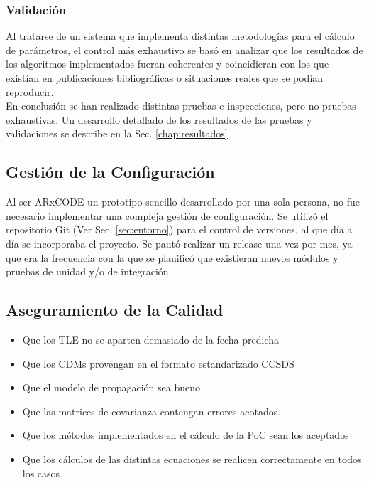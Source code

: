 \subsubsection*{Validaci\'on}

Al tratarse de un sistema que implementa distintas metodolog\'ias para el c\'alculo de par\'ametros, el control m\'as exhaustivo se bas\'o en analizar que los resultados de los algoritmos implementados fueran coherentes y coincidieran con los que exist\'ian en publicaciones bibliogr\'aficas o situaciones reales que se pod\'ian reproducir. \\

En conclusi\'on se han realizado distintas pruebas e inspecciones, pero no pruebas exhaustivas.
Un desarrollo detallado de los resultados de las pruebas y validaciones se describe en la Sec. \ref{chap:resultados}\\

\subsection{Gesti\'on de la Configuraci\'on}

Al ser ARxCODE un prototipo sencillo desarrollado por una sola persona, no fue necesario implementar una compleja gesti\'on de configuraci\'on. Se utiliz\'o el repositorio Git (Ver Sec. \ref{sec:entorno}) para el control de versiones, al que d\'ia a d\'ia se incorporaba el proyecto. Se paut\'o realizar un release una vez por mes, ya que era la frecuencia con la que se planific\'o que existieran nuevos m\'odulos y pruebas de unidad y/o de integraci\'on. 


\subsection{Aseguramiento de la Calidad}

\begin{itemize}
 \item Que los TLE no se aparten demasiado de la fecha predicha
 \item Que los CDMs provengan en el formato estandarizado CCSDS
 \item Que el modelo de propagaci\'on sea bueno
 \item Que las matrices de covarianza contengan errores acotados. 
 \item Que los m\'etodos implementados en el c\'alculo de la PoC sean los aceptados
 \item Que los c\'alculos de las distintas ecuaciones se realicen correctamente en todos los casos
\end{itemize}



